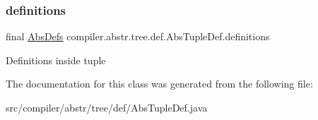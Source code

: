 \subsubsection{\texorpdfstring{definitions}{definitions}}
{\footnotesize\ttfamily final \hyperlink{classcompiler_1_1abstr_1_1tree_1_1_abs_defs}{Abs\+Defs} compiler.\+abstr.\+tree.\+def.\+Abs\+Tuple\+Def.\+definitions}

Definitions inside tuple 

The documentation for this class was generated from the following file\+:\begin{DoxyCompactItemize}
\item 
src/compiler/abstr/tree/def/Abs\+Tuple\+Def.\+java\end{DoxyCompactItemize}
